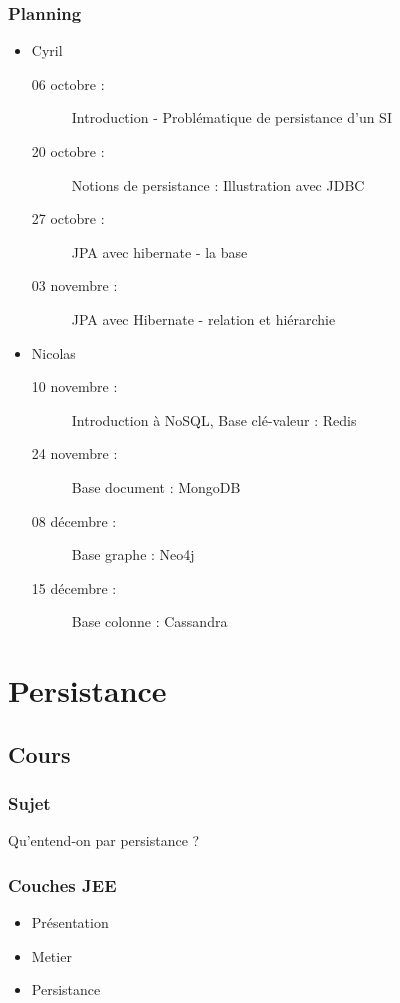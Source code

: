 \documentclass[t,12pt]{beamer}
\begin{document}
\begin{frame}
	\frametitle{Planning}

	\begin{itemize}
		\item Cyril
			\begin{description}
				\item [06 octobre :] Introduction - Probl\'ematique de persistance d'un SI
				\item [20 octobre :] Notions de persistance : Illustration avec JDBC
				\item [27 octobre :] JPA avec hibernate - la base
				\item [03 novembre :] JPA avec Hibernate - relation et hi\'erarchie
			\end{description}
		\item Nicolas
			\begin{description}
				\item [10 novembre :] Introduction \`a NoSQL, Base cl\'e-valeur : Redis
				\item [24 novembre :] Base document : MongoDB
				\item [08 d\'ecembre :] Base graphe : Neo4j
				\item [15 d\'ecembre :] Base colonne : Cassandra
			\end{description}
	\end{itemize}
\end{frame}



\section{Persistance}

\begin{frame}
	\tableofcontents[currentsection]
\end{frame}

\subsection{Cours}
\begin{frame}
	\frametitle{Sujet}

	Qu'entend-on par persistance ?
\end{frame}

\begin{frame}
	\frametitle{Couches JEE}

	\begin{itemize}
		\item Pr\'esentation
		\item Metier
		\item Persistance
	\end{itemize}
\end{frame}
\end{document}
